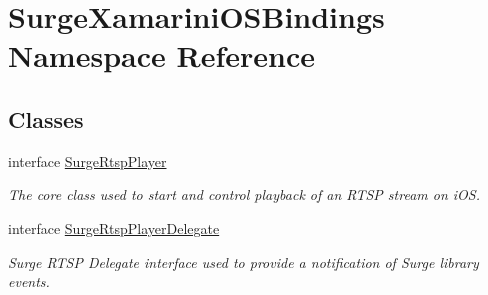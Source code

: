 \hypertarget{namespace_surge_xamarini_o_s_bindings}{}\section{Surge\+Xamarini\+O\+S\+Bindings Namespace Reference}
\label{namespace_surge_xamarini_o_s_bindings}
\subsection*{Classes}
\begin{DoxyCompactItemize}
\item 
interface \hyperlink{interface_surge_xamarini_o_s_bindings_1_1_surge_rtsp_player}{Surge\+Rtsp\+Player}
\begin{DoxyCompactList}\small\item\em The core class used to start and control playback of an R\+T\+SP stream on i\+OS. \end{DoxyCompactList}\item 
interface \hyperlink{interface_surge_xamarini_o_s_bindings_1_1_surge_rtsp_player_delegate}{Surge\+Rtsp\+Player\+Delegate}
\begin{DoxyCompactList}\small\item\em Surge R\+T\+SP Delegate interface used to provide a notification of Surge library events. \end{DoxyCompactList}\end{DoxyCompactItemize}
